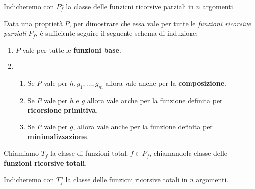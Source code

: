 \documentclass{lectures}
\begin{document}
\begin{multicols}{2}
\begin{definition}
        Indicheremo con \(P_f^n\) la classe delle funzioni ricorsive parziali in \(n\) argomenti.
    \end{definition}
    \begin{observation}
        Data una proprietà \(P\), per dimostrare che essa vale per tutte le \textit{funzioni ricorsive parziali} \(P_f\), è sufficiente seguire il seguente schema di induzione:
        \begin{enumerate}
            \item \(P\) vale per tutte le \textbf{funzioni base}.
            \item \begin{enumerate}
                \item Se \(P\) vale per \(h, g_1, \ldots, g_m\) allora vale anche per la \textbf{composizione}.
                \item Se \(P\) vale per \(h\) e \(g\) allora vale anche per la funzione definita per \textbf{ricorsione primitiva}.
                \item Se \(P\) vale per \(g\), allora vale anche per la funzione definita per \textbf{minimalizzazione}.
            \end{enumerate}
        \end{enumerate}
    \end{observation}
    \begin{definition}
        Chiamiamo \(T_f\) la classe di funzioni totali \(f\in P_f\), chiamandola classe delle \textbf{funzioni ricorsive totali}. 
        
        Indicheremo con \(T_f^n\) la classe delle funzioni ricorsive totali in \(n\) argomenti.
    \end{definition}
\end{multicols}
\clearpage
\end{document}
